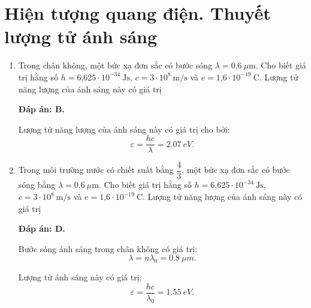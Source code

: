 
\section{Hiện tượng quang điện. Thuyết lượng tử ánh sáng}
\begin{enumerate}[label=\bfseries Câu \arabic*:]
	\item {} 
		\cauhoi
	{Trong chân không, một bức xạ đơn sắc có bước sóng $\lambda =\text{0,6}\ \mu\text{m}$. Cho biết giá trị hằng số $h=\text{6,625}\cdot 10^{-34}\ \text{Js}$, $c=3\cdot 10^8\ \text{m/s}$ và $e=\text{1,6}\cdot 10^{-19}\ \text{C}$. Lượng tử năng lượng của ánh sáng này có giá trị
	}
	
	\loigiai
	{		\textbf{Đáp án: B.}
		
Lượng tử năng lượng của ánh sáng này có giá trị cho bởi:
$$
	\varepsilon = \dfrac{hc}{\lambda} = \SI{2,07}{eV}.
$$
		
	}
	
	\item {} 
		\cauhoi
	{Trong môi trường nước có chiết suất bằng $\dfrac{4}{3}$, một bức xạ đơn sắc có bước sóng bằng $\lambda =\text{0,6}\ \mu\text{m}$. Cho biết giá trị hằng số $h=\text{6,625}\cdot 10^{-34}\ \text{Js}$, $c=3\cdot 10^8\ \text{m/s}$ và $e=\text{1,6}\cdot 10^{-19}\ \text{C}$. Lượng tử năng lượng của ánh sáng này có giá trị
	}
	
	\loigiai
	{		\textbf{Đáp án: D.}
	
Bước sóng ánh sáng trong chân không có giá trị:
$$
	\lambda = n \lambda_{0} = \SI{0,8}{\mu m}.
$$
		
Lượng tử ánh sáng này có giá trị:
$$
	\varepsilon = \dfrac{hc}{\lambda_{0}} = \SI{1,55}{eV}.
$$
		
	}
	

\end{enumerate}
